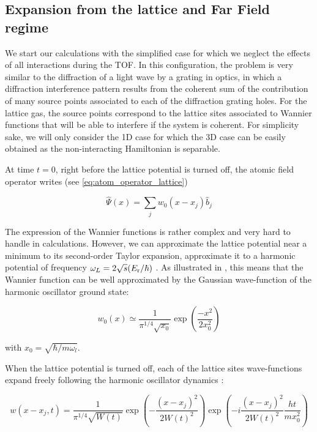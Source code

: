 \subsection{Expansion from the lattice and Far Field regime}

We start our calculations with the simplified case for which we neglect the effects of all interactions during the TOF. In this configuration, the problem is very similar to the diffraction of a light wave by a grating in optics, in which a diffraction interference pattern results from the coherent sum of the contribution of many source points associated to each of the diffraction grating holes. For the lattice gas, the source points correspond to the lattice sites associated to Wannier functions that will be able to interfere if the system is coherent. For simplicity sake, we will only consider the 1D case for which the 3D case can be easily obtained as the non-interacting Hamiltonian is separable.

At time $t=0$, right before the lattice potential is turned off, the atomic field operator writes (see \ref{eq:atom_operator_lattice})

\begin{equation}
    \hat{\Psi}(x)= \sum_{j} w_{0}(x-x_j) \hat{b}_{j} 
    \label{eq:field_operator}
\end{equation}



The expression of the Wannier functions is rather complex and very hard to handle in calculations. However, we can approximate the lattice potential near a minimum to its second-order Taylor expansion, \ie approximate it to a harmonic potential of frequency $\omega_L=2 \sqrt{s} (E_{\rm{r}}/\hbar)$ \cite{toth2008theory}. As illustrated in , this means that the Wannier function can be well approximated by the Gaussian wave-function of the harmonic oscillator ground state:

\begin{equation}
    w_0(x) \simeq \frac{1}{\pi^{1 / 4} \sqrt{x_{0}}} \exp \left(\frac{-x^{2}}{2 x_{0}^{2}}\right)
\end{equation}

\noindent with $x_{0}=\sqrt{\hbar / m \omega_{l}}$.

When the lattice potential is turned off, each of the lattice sites wave-functions expand freely following the harmonic oscillator dynamics \cite{toth2008theory}:

\begin{equation}
    w\left(x-x_{j}, t\right)=\frac{1}{\pi^{1 / 4} \sqrt{W(t)}} \exp \left(-\frac{\left(x-x_{j}\right)^{2}}{2 W(t)^{2}}\right) \exp \left(-i \frac{\left(x-x_{j}\right)^{2}}{2 W(t)^{2}} \frac{h t}{m x_{0}^{2}}\right)
    \label{eq:time_dependent_wannier}
\end{equation}

